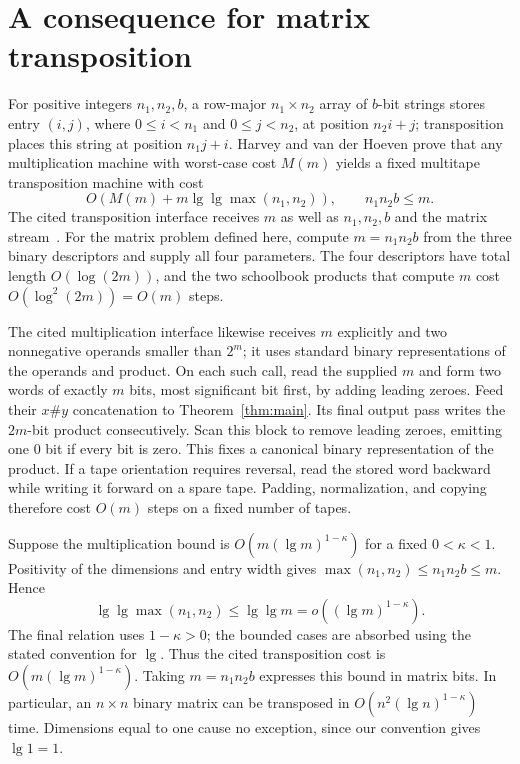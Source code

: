 \section{A consequence for matrix transposition}
\label{sec:transposition}

For positive integers $n_1,n_2,b$, a row-major $n_1\times n_2$ array
of $b$-bit strings stores
entry $(i,j)$, where $0\le i<n_1$ and $0\le j<n_2$, at position
$n_2i+j$; transposition places this string at position $n_1j+i$.
Harvey and van der Hoeven prove that any multiplication machine with
worst-case cost $M(m)$ yields a fixed multitape transposition machine with
cost~\cite[Corollary~6.2]{HarveyHoeven2025}
\[
O\!\left(M(m)+m\lg\lg\max(n_1,n_2)\right),
 \qquad n_1n_2b\le m.
\]
The cited transposition interface receives $m$ as well as $n_1,n_2,b$
and the matrix stream~\cite[Section~1.1]{HarveyHoeven2025}. For the
matrix problem defined here, compute $m=n_1n_2b$ from the three binary
descriptors and supply all four parameters. The four descriptors have total length
$O(\log(2m))$, and the two schoolbook products that compute $m$ cost
$O(\log^2(2m))=O(m)$ steps.

The cited multiplication interface likewise receives $m$ explicitly
and two nonnegative operands smaller than $2^m$; it uses standard binary
representations of the operands and product. On each such call, read the
supplied $m$ and form two words
of exactly $m$ bits, most significant bit first, by adding leading zeroes.
Feed their $x\#y$ concatenation to Theorem~\ref{thm:main}. Its final
output pass writes the $2m$-bit product consecutively. Scan this block
to remove leading zeroes, emitting one $0$ bit if every bit is zero.
This fixes a canonical binary representation of the product.
If a tape orientation requires reversal, read the stored word backward
while writing it forward on a spare tape. Padding, normalization, and
copying therefore cost $O(m)$ steps on a fixed number of tapes.

Suppose the multiplication bound is $O(m(\lg m)^{1-\kappa})$ for a
fixed $0<\kappa<1$.  Positivity of the dimensions and entry width gives
$\max(n_1,n_2)\le n_1n_2b\le m$.  Hence
\[
 \lg\lg\max(n_1,n_2)\le\lg\lg m
   =o((\lg m)^{1-\kappa}).
\]
The final relation uses $1-\kappa>0$; the bounded cases are absorbed
using the stated convention for $\lg$.  Thus the cited transposition
cost is $O(m(\lg m)^{1-\kappa})$.  Taking $m=n_1n_2b$ expresses this
bound in matrix bits. In particular, an
$n\times n$ binary matrix can be transposed in
$O(n^2(\lg n)^{1-\kappa})$ time. Dimensions equal to one cause no
exception, since our convention gives $\lg1=1$.
